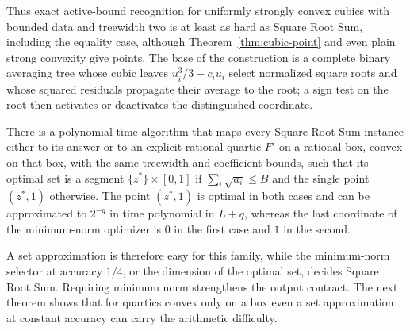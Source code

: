Thus exact active-bound recognition for uniformly strongly convex cubics
with bounded data and treewidth two is at least as hard as Square Root Sum,
including
the equality case, although Theorem~\ref{thm:cubic-point} and even plain
strong convexity give points. The base of the construction is a complete
binary averaging tree whose cubic leaves $u_i^3/3-c_iu_i$ select normalized
square roots and whose squared residuals propagate their average to the
root; a sign test on the root then activates or deactivates the
distinguished coordinate.

\begin{proposition}\label{prop:points-selector}
There is a polynomial-time algorithm that maps every Square Root Sum
instance either to its answer or to an explicit rational quartic $F'$ on a
rational box, convex on that box, with the same treewidth and coefficient
bounds, such that its optimal set is a segment $\{z^*\}\times[0,1]$ if
$\sum_i\sqrt{a_i}\le B$ and the single point $(z^*,1)$ otherwise. The
point $(z^*,1)$ is optimal in both cases and can be approximated to $2^{-q}$
in time polynomial in $L+q$, whereas the last coordinate of the minimum-norm
optimizer is $0$ in the first case and $1$ in the second.
\end{proposition}

A set approximation is therefore easy for this family, while the
minimum-norm selector at accuracy $1/4$, or the dimension of the optimal set,
decides Square Root Sum. Requiring minimum norm strengthens the output
contract. The next
theorem shows that for quartics convex only on a box even a set
approximation at constant accuracy can carry the arithmetic difficulty.

